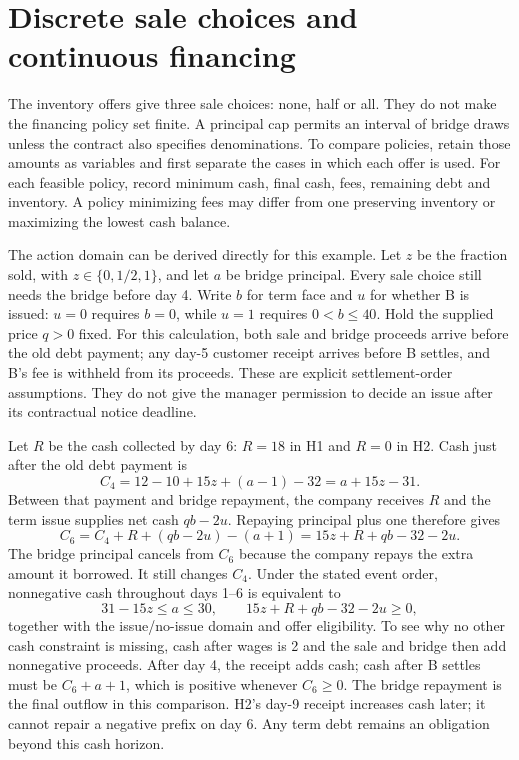 \section{Discrete sale choices and continuous financing}
The inventory offers give three sale choices: none, half or all. They do not
make the financing policy set finite. A principal cap permits an interval of
bridge draws unless the contract also specifies denominations. To compare
policies, retain those amounts as variables and first separate the cases in
which each offer is used. For each feasible policy, record minimum cash, final
cash, fees, remaining debt and inventory. A policy minimizing fees may differ
from one preserving inventory or maximizing the lowest cash balance.

The action domain can be derived directly for this example. Let $z$ be the
fraction sold, with $z\in\{0,1/2,1\}$, and let $a$ be bridge principal. Every
sale choice still needs the bridge before day 4. Write $b$ for term face and
$u$ for whether B is issued: $u=0$ requires $b=0$, while $u=1$ requires
$0<b\leq40$. Hold the supplied price $q>0$ fixed. For this calculation, both
sale and bridge proceeds arrive before the old debt payment; any day-5 customer
receipt arrives before B settles, and B's fee is withheld from its proceeds.
These are explicit settlement-order assumptions. They do not give the manager
permission to decide an issue after its contractual notice deadline.

Let $R$ be the cash collected by day 6: $R=18$ in H1 and $R=0$ in H2.
Cash just after the old debt payment is
\begin{equation}
 C_4=12-10+15z+(a-1)-32=a+15z-31.
\end{equation}
Between that payment and bridge repayment, the company receives $R$ and the
term issue supplies net cash $qb-2u$. Repaying principal plus one therefore gives
\begin{equation}
 C_6=C_4+R+(qb-2u)-(a+1)
     =15z+R+qb-32-2u.
\end{equation}
The bridge principal cancels from $C_6$ because the company repays the extra
amount it borrowed. It still changes $C_4$. Under the stated event order,
nonnegative cash throughout days 1--6 is equivalent to
\begin{equation}
 31-15z\leq a\leq30,
 \qquad 15z+R+qb-32-2u\geq0,
\end{equation}
together with the issue/no-issue domain and offer eligibility. To see why no
other cash constraint is missing, cash after wages is 2 and the sale and bridge
then add nonnegative proceeds. After day 4, the receipt adds cash; cash after B
settles must be $C_6+a+1$, which is positive whenever $C_6\geq0$. The bridge
repayment is the final outflow in this comparison. H2's day-9 receipt increases
cash later; it cannot repair a negative prefix on day 6. Any term debt remains
an obligation beyond this cash horizon.


